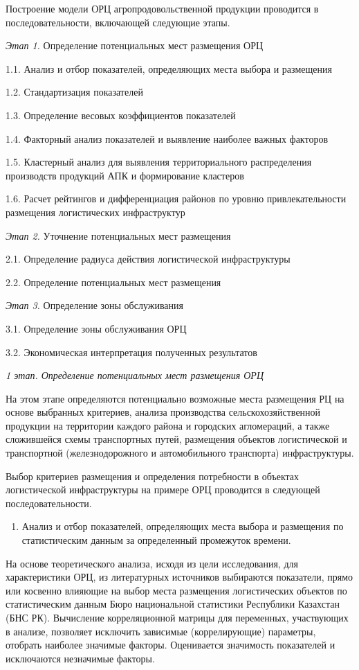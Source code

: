 Построение модели ОРЦ агропродовольственной продукции проводится в
последовательности, включающей следующие этапы.

\emph{Этап 1.} Определение потенциальных мест размещения ОРЦ

1.1. Анализ и отбор показателей, определяющих места выбора и размещения

1.2. Стандартизация показателей

1.3. Определение весовых коэффициентов показателей

1.4. Факторный анализ показателей и выявление наиболее важных факторов

1.5. Кластерный анализ для выявления территориального распределения
производств продукций АПК и формирование кластеров

1.6. Расчет рейтингов и дифференциация районов по уровню
привлекательности размещения логистических инфраструктур

\emph{Этап 2.} Уточнение потенциальных мест размещения

2.1. Определение радиуса действия логистической инфраструктуры

2.2. Определение потенциальных мест размещения

\emph{Этап 3.} Определение зоны обслуживания

3.1. Определение зоны обслуживания ОРЦ

3.2. Экономическая интерпретация полученных результатов

\emph{1 этап. Определение потенциальных мест размещения ОРЦ}

На этом этапе определяются потенциально возможные места размещения РЦ на
основе выбранных критериев, анализа производства сельскохозяйственной
продукции на территории каждого района и городских агломераций, а также
сложившейся схемы транспортных путей, размещения объектов логистической
и транспортной (железнодорожного и автомобильного транспорта)
инфраструктуры.

Выбор критериев размещения и определения потребности в объектах
логистической инфраструктуры на примере ОРЦ проводится в следующей
последовательности.

\begin{enumerate}
\def\labelenumi{\arabic{enumi}.}
\item
  Анализ и отбор показателей, определяющих места выбора и размещения по
  статистическим данным за определенный промежуток времени.
\end{enumerate}

На основе теоретического анализа, исходя из цели исследования, для
характеристики ОРЦ, из литературных источников выбираются показатели,
прямо или косвенно влияющие на выбор места размещения логистических
объектов по статистическим данным Бюро национальной статистики
Республики Казахстан (БНС РК). Вычисление корреляционной матрицы для
переменных, участвующих в анализе, позволяет исключить зависимые
(коррелирующие) параметры, отобрать наиболее значимые факторы.
Оценивается значимость показателей и исключаются незначимые факторы.

